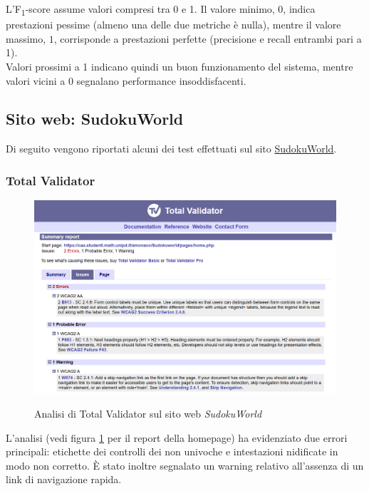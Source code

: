 \noindent L’F\textsubscript{1}-score assume valori compresi tra 0 e 1. Il valore minimo, \(0\), indica prestazioni pessime (almeno una delle due metriche è nulla), mentre il valore massimo, \(1\), corrisponde a prestazioni perfette (precisione e recall entrambi pari a 1).\\
Valori prossimi a 1 indicano quindi un buon funzionamento del sistema, mentre valori vicini a 0 segnalano performance insoddisfacenti.


\subsection{Sito web: SudokuWorld}
\noindent Di seguito vengono riportati alcuni dei test effettuati sul sito \href{https://caa.studenti.math.unipd.it/amonaco/Sudokuworld/pages/home.php}{SudokuWorld}.

\subsubsection{Total Validator}
\begin{figure}[H]
    \centering
    \includegraphics[width=0.7\linewidth, alt={Screenshot dell'analisi di Total Validator sul sito web SudokuWorld}]{img/TV_sudoku.png}
    \caption{Analisi di Total Validator sul sito web \textit{SudokuWorld}}\label{fig:TV_sudoku}
\end{figure}

\noindent L'analisi (vedi figura \ref{fig:TV_sudoku} per il report della homepage) ha evidenziato due errori principali: etichette dei controlli dei  non univoche e intestazioni nidificate in modo non corretto. 
È stato inoltre segnalato un warning relativo all’assenza di un link di navigazione rapida. 
 

